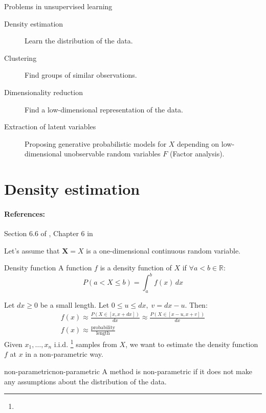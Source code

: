 \begin{example}{Problems in unsupervised learning}{}
	\tcbline
	\begin{description}
		\item[Density estimation] Learn the distribution of the data.
		\item[Clustering] Find groups of similar observations.
		\item[Dimensionality reduction] Find a low-dimensional representation of the data.
		\item[Extraction of latent variables] Proposing generative probabilistic models for $X$
			depending on low-dimensional unobservable random variables $F$ (Factor analysis).
	\end{description}
\end{example}

\pagebreak
\section{Density estimation}

\paragraph{References:} Section 6.6 of \cite{hastie_elements_2009}, Chapter 6 in \cite{wasserman_all_2006}

Let's assume that $\mathbf{X} = X$ is a one-dimensional continuous random variable.

\begin{definition}{Density function}{}
	A function $f$ is a density function of $X$ if $\forall a < b \in \mathds{R}$:
	\begin{equation*}
		P(a < X \leq b) = \int_a^b f(x) \, dx
	\end{equation*}
\end{definition}

Let $dx \geq 0$ be a small length. Let $0 \leq u \leq dx,\; v = dx - u$. Then:
\begin{align*}
	f(x) \approx \frac{P(X \in [x, x + dx])}{dx} \approx \frac{P(X \in [ x - u, x + v])}{dx} \\
	f(x) \approx \frac{\text{probability}}{\text{length}}
\end{align*}
Given $x_1, \ldots, x_n$ i.i.d.%
%
\footnote{}
samples from $X$, we want to estimate the density function $f$
at $x$ in a non-parametric way.

\begin{definition}{non-parametric}{non-parametric}
	A method is non-parametric if it does not make any assumptions about the
	distribution of the data.
\end{definition}

